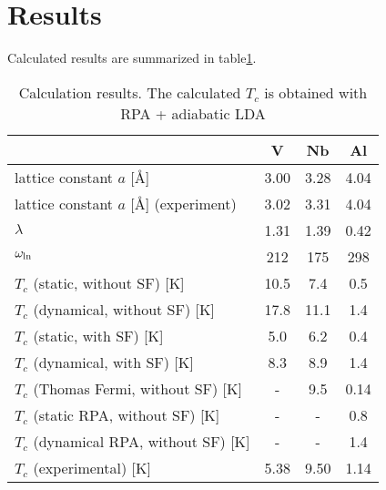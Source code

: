 \section{Results}
Calculated results are summarized in table\ref{tab:results}.

\begin{table}[hbtp]
	\centering
	\caption{Calculation results. The calculated $T_c$ is obtained with RPA + adiabatic LDA} 
	\begin{tabular}{lccc}
		\hline \hline
		& V & Nb & Al \\
		\hline
		lattice constant $a$ [\AA] & 3.00 & 3.28 & 4.04 \\
		lattice constant $a$ [\AA] (experiment) & 3.02\cite{Kuentzler1985} & 3.31\cite{Laesser1985} & 4.04\cite{Sumiyama1990} \\
		\hline
		$\lambda$ & 1.31 & 1.39 & 0.42 \\
		$\omega_{\rm ln}$ & 212 & 175 & 298 \\
		\hline
		$T_c$ (static, without SF) [K] & 10.5 & 7.4 & 0.5 \\
		$T_c$ (dynamical, without SF) [K] & 17.8 & 11.1 & 1.4 \\
		$T_c$ (static, with SF) [K] & 5.0 & 6.2 & 0.4 \\
		$T_c$ (dynamical, with SF) [K] & 8.3 & 8.9 & 1.4 \\
		$T_c$ (Thomas Fermi, without SF) [K] & - & 9.5\cite{Luders2005} & 0.14\cite{Luders2005} \\
		$T_c$ (static RPA, without SF) [K] & - & - & 0.8\cite{RA2013} \\
		$T_c$ (dynamical RPA, without SF) [K] & - & - & 1.4\cite{RA2013} \\
		$T_c$ (experimental)\cite{Ashcroft} [K] & 5.38 & 9.50 & 1.14 \\
		\hline \hline
	\end{tabular}
	\label{tab:results}
\end{table}

